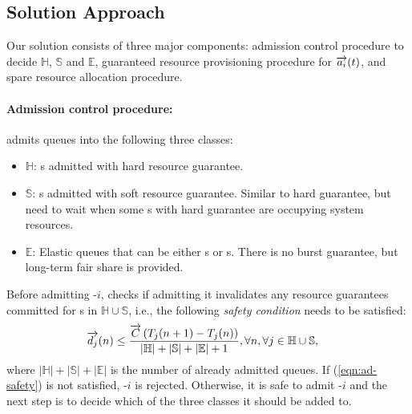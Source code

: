 
\subsection{Solution Approach}
\label{sec:solution_approach}




Our solution \name consists of three major components: admission control procedure to decide $\mathbb{H}$, $\mathbb{S}$ and $\mathbb{E}$, guaranteed resource provisioning procedure for $\protect\overrightarrow{a_i}(t)$, and spare resource allocation procedure. 

\paragraph{Admission control procedure:} 
\name admits queues into the following three classes: 
\begin{itemize}
\item $\mathbb{H}$: {\burstq}s admitted with hard resource guarantee.
\item $\mathbb{S}$: {\burstq}s admitted with soft resource guarantee. Similar to hard guarantee, but need to wait when some {\burstq}s with hard guarantee are occupying system resources. %
\item $\mathbb{E}$: Elastic queues that can be either {\burstq}s or {\batchq}s. There is no burst guarantee, but long-term fair share is provided.
\end{itemize}



Before admitting \burstq-$i$, \name checks if admitting it invalidates any resource guarantees committed for {\burstq}s in $\mathbb{H}\cup\mathbb{S}$, i.e., the following \emph{safety condition} needs to be satisfied: 
\begin{align}
	\label{eqn:ad-safety}
    \begin{aligned}
	& \protect\overrightarrow{d_j}(n) \leq \frac{\protect\overrightarrow{C}\left(T_j(n+1)-T_j(n)\right)}{|\mathbb{H}|+|\mathbb{S}|+|\mathbb{E}|+1}, \forall n, \forall j \in \mathbb{H}\cup\mathbb{S},
    \end{aligned}    
\end{align}
where $|\mathbb{H}|+|\mathbb{S}|+|\mathbb{E}|$ is the number of already admitted queues. 
If (\ref{eqn:ad-safety}) is not satisfied, \burstq-$i$ is rejected. Otherwise, it is safe to admit \burstq-$i$ and the next step is to decide which of the three classes it should be added to.

